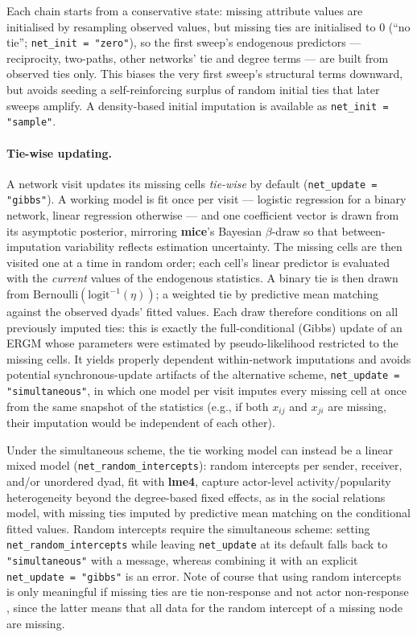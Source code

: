 \documentclass[11pt,a4paper]{article}
\newcommand{\pkg}[1]{\textbf{#1}}
\newcommand{\code}[1]{\texttt{#1}}
\begin{document}
Each chain starts from a conservative state: missing attribute
values are initialised by resampling observed values, but missing ties are
initialised to $0$ (``no tie''; \code{net\_init = "zero"}), so the first
sweep's endogenous predictors --- reciprocity, two-paths, other networks'
tie and degree terms --- are built from observed ties only. This biases the
very first sweep's structural terms downward, but avoids seeding a
self-reinforcing surplus of random initial ties that later sweeps amplify. A density-based initial imputation is available as \code{net\_init = "sample"}.

\paragraph{Tie-wise updating.} A network visit updates its missing cells
\emph{tie-wise} by default (\code{net\_update = "gibbs"}). A working model
is fit once per visit --- logistic regression for a
binary network, linear regression otherwise --- and one coefficient vector
is drawn from its asymptotic posterior, mirroring \pkg{mice}'s Bayesian
$\beta$-draw so that between-imputation variability reflects estimation
uncertainty. The missing cells are then visited one at a time in random
order; each cell's linear predictor is evaluated with the \emph{current}
values of the endogenous statistics. A binary tie is then drawn from
$\mathrm{Bernoulli}(\mathrm{logit}^{-1}(\eta))$; a weighted tie by
predictive mean matching against the observed dyads' fitted values. Each
draw therefore conditions on all previously imputed ties: this is exactly
the full-conditional (Gibbs) update of an ERGM whose parameters were
estimated by pseudo-likelihood restricted to the missing cells. It yields properly dependent within-network
imputations and avoids potential synchronous-update artifacts of the alternative
scheme, \code{net\_update = "simultaneous"}, in which one model
per visit imputes every missing cell at once from the same snapshot
of the statistics (e.g., if both $x_{ij}$ and $x_{ji}$ are missing, their imputation would be independent of each other).

Under the simultaneous scheme, the tie working model can instead be a
linear mixed model (\code{net\_random\_intercepts}): random intercepts per
sender, receiver, and/or unordered dyad, fit with \pkg{lme4}, capture
actor-level activity/popularity heterogeneity beyond the degree-based fixed
effects, as in the social relations model, with missing ties imputed by
predictive mean matching on the conditional fitted values. Random
intercepts require the simultaneous scheme: setting
\code{net\_random\_intercepts} while leaving \code{net\_update} at its
default falls back to \code{"simultaneous"} with a message, whereas
combining it with an explicit \code{net\_update = "gibbs"} is an error. Note of course that using random intercepts is only meaningful if missing ties are tie non-response and not actor non-response \citep{huisman2008}, since the latter means that all data for the random intercept of a missing node are missing.
\end{document}
